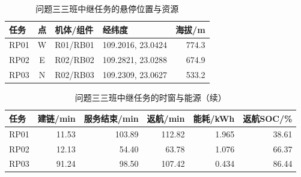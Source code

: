 \begin{table}[H]\centering\normalsize
\caption{问题三三班中继任务的悬停位置与资源}\label{tab:q3_relay_tasks}
\begin{tabular}{lcllr}
\toprule
任务 & 点 & 机体/组件 & 经纬度 & 海拔/m\\\midrule
RP01 & W & R01/RB01 & 109.2016, 23.0424 & 774.3\\
RP02 & E & R02/RB02 & 109.2821, 23.0288 & 674.9\\
RP03 & N & R02/RB03 & 109.2309, 23.0627 & 533.2\\
\bottomrule\end{tabular}
\end{table}
\begin{table}[H]\centering\normalsize
\caption{问题三三班中继任务的时窗与能源（续）}\label{tab:q3_relay_metrics}
\begin{tabular}{lrrrrr}
\toprule
任务 & 建链/min & 服务结束/min & 返航/min & 能耗/kWh & 返航SOC/\%\\\midrule
RP01 & 11.53 & 103.89 & 112.82 & 1.965 & 38.61\\
RP02 & 12.13 & 54.40 & 63.78 & 1.076 & 66.37\\
RP03 & 91.24 & 98.50 & 107.42 & 0.434 & 86.44\\
\bottomrule\end{tabular}
\end{table}
